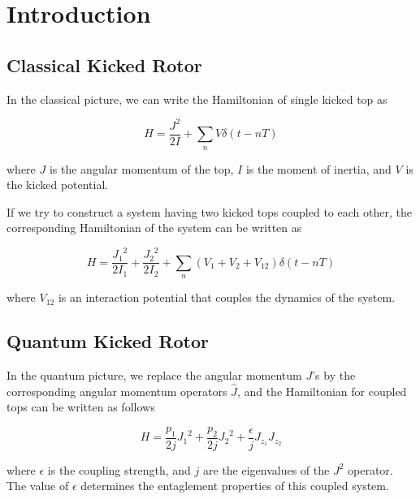 
\chapter{Introduction} %

\label{Introduction} %


\section{Classical Kicked Rotor}

In the classical picture, we can write the Hamiltonian of single kicked top as 

\begin{equation}
{H}=\frac{{J}^2}{2{I}} +\sum_{n} {V}\delta(t-nT)
\end{equation}

where ${J}$ is the angular momentum of the top, ${I}$ is the moment of inertia, and ${V}$ is the kicked potential.

If we try to construct a system having two kicked tops coupled to each other, the corresponding Hamiltonian of the system can be written as

\begin{equation}
H=\frac{{J_1}^2}{2{I_1}}+\frac{{J_2}^2}{2{I_2}}+\sum_{n} (V_1+V_2+V_{12})\delta(t-nT)
\end{equation}

where $V_{12}$ is an interaction potential that couples the dynamics of the system.

\section{Quantum Kicked Rotor}
In the quantum picture, we replace the angular momentum $J$'s by the corresponding angular momentum operators $\hat{J}$, and the Hamiltonian for coupled tops can be written as follows

\begin{equation}
H=\frac{p_1}{2j}{J_1}^2+\frac{p_2}{2j}{J_2}^2+\frac{\epsilon}{j}J_{z_1}J_{z_2}
\end{equation} 

where $\epsilon$ is the coupling strength, and $j$ are the eigenvalues of the $J^2$ operator. The value of $\epsilon$ determines the entaglement properties of this coupled system.

